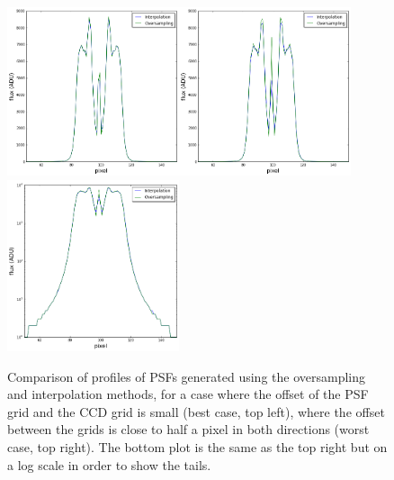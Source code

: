 \documentclass[11pt]{article}      %
\begin{document}
\begin{figure}[hbtp]
  \begin{center}
    \includegraphics[width=0.45\textwidth]{psf_interp_best.png}\hspace{0.4cm}\includegraphics[width=0.45\textwidth]{psf_interp_worst.png}\\
    \includegraphics[width=0.45\textwidth]{psf_interp_worst_log.png}
    \caption{Comparison of profiles of PSFs generated using the oversampling and interpolation methods, for a case where the offset of the PSF grid and the CCD grid is small (best case, top left), where the offset between the grids is close to half a pixel in both directions (worst case, top right). The bottom plot is the same as the top right but on a log scale in order to show the tails.}
    \label{fig:interp}
  \end{center}
\end{figure}
\end{document}

